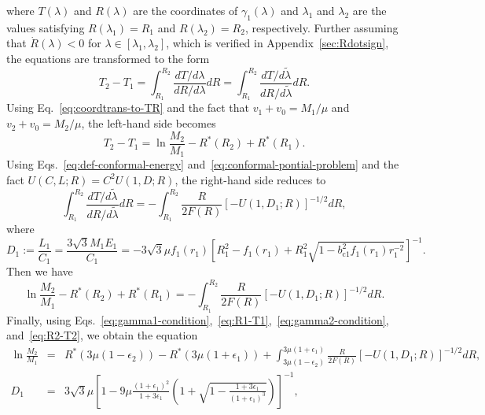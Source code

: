 \documentclass[prd,showpacs,preprintnumbers,groupedaddress,superscriptaddress,nofootinbib,11pt]{revtex4-1} %
\theoremstyle{newplain}
\newcommand{\mr}[1]{\mathrm{#1}}
\begin{document}
where $T(\lambda)$ and $R(\lambda)$ are the coordinates of $\gamma_1(\lambda)$ and $\lambda_1$ and $\lambda_2$ are the values satisfying $R(\lambda_1)=R_1$ and $R(\lambda_2)=R_2$, respectively.
Further assuming that $\dot{R}(\lambda)<0$ for $\lambda\in[\lambda_1,\lambda_2]$, which is verified in Appendix~\ref{sec:Rdotsign}, the equations are transformed to the form
\begin{equation}
T_2-T_1=\int^{R_2}_{R_1}\frac{dT/d\lambda}{dR/d\lambda}dR=\int^{R_2}_{R_1}\frac{dT/d\widetilde{\lambda}}{dR/d\widetilde{\lambda}}dR.
\end{equation}
Using Eq.~\eqref{eq:coordtrans-to-TR} and the fact that $v_1+v_0=M_1/\mu$ and $v_2+v_0=M_2/\mu$, the left-hand side becomes
\begin{equation}
T_2-T_1=\ln\frac{M_2}{M_1}-R^*(R_2)+R^*(R_1).
\end{equation}
Using Eqs.~\eqref{eq:def-conformal-energy} and~\eqref{eq:conformal-pontial-problem} and the fact $U(C,L;R)=C^2U(1,D;R)$, the right-hand side reduces to
\begin{equation}
\int^{R_2}_{R_1}\frac{dT/d\widetilde{\lambda}}{dR/d\widetilde{\lambda}}dR=-\int^{R_2}_{R_1}\frac{R}{2F(R)}\left[-U(1,D_1;R)\right]^{-1/2}dR,
\end{equation}
where
\begin{equation}
D_1:=\frac{L_1}{C_1}=\frac{3\sqrt{3}M_1E_1}{C_1}
=-3\sqrt{3}\mu f_1(r_1)\left[R_1^2-f_1(r_1)+R_1^2\sqrt{1-b_{\mr{c}1}^2f_1(r_1)r_1^{-2}}\right]^{-1}.
\end{equation}
Then we have
\begin{equation}
\ln\frac{M_2}{M_1}-R^*(R_2)+R^*(R_1)
=-\int^{R_2}_{R_1}\frac{R}{2F(R)}\left[-U(1,D_1;R)\right]^{-1/2}dR.
\end{equation}
Finally, using Eqs.~\eqref{eq:gamma1-condition},~\eqref{eq:R1-T1},~\eqref{eq:gamma2-condition}, and~\eqref{eq:R2-T2},  we obtain the equation
\begin{eqnarray}
\label{eq:reduced-2ndjc}
\ln\frac{M_2}{M_1}
&=&R^*\left(3\mu(1-\epsilon_2)\right)-R^*\left(3\mu(1+\epsilon_1)\right)
+\int^{3\mu(1+\epsilon_1)}_{3\mu(1-\epsilon_2)}\frac{R}{2F(R)}\left[-U(1,D_1;R)\right]^{-1/2}dR,\nonumber\\
D_1&=&3\sqrt{3}\mu \left[1-9\mu\frac{(1+\epsilon_1)^2}{1+3\epsilon_1}\left(1+\sqrt{1-\frac{1+3\epsilon_1}{(1+\epsilon_1)^3}}\right)\right]^{-1},
\end{eqnarray}
\end{document}
